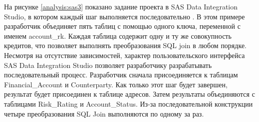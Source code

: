 \begin{figure}[ht!]
\end{figure}

На рисунке \ref{analysis:sas3} показано задание проекта в SAS Data Integration Studio, в котором каждый шаг выполняется последовательно \cite{bib14}. 
В этом примере разработчик объединяет пять таблиц с помощью одного ключа, переменной с именем account\_rk. 
Каждая таблица содержит одну и ту же совокупность кредитов, что позволяет выполнять преобразования SQL join в любом порядке. 
Несмотря на отсутствие зависимостей, характер пользовательского интерфейса 
SAS Data Integration Studio позволяет разработчику разрабатывать последовательный процесс. 
Разработчик сначала присоединяется к таблицам Financial\_Account и Counterparty. 
Как только этот шаг будет завершен, результат будет присоединен к таблице адресов. 
Затем результаты объединяются с таблицами Risk\_Rating и Account\_Status. 
Из-за последовательной конструкции четыре преобразования SQL Join выполняются по одному за раз.

\begin{figure}[ht!]
\end{figure}

